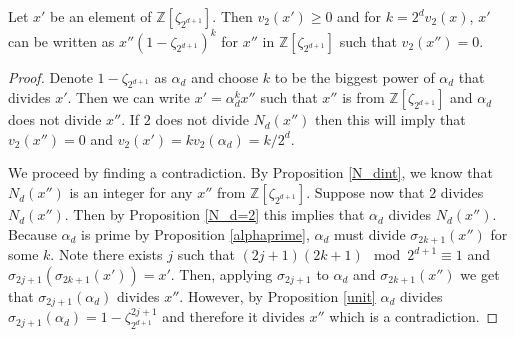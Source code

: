 \documentclass[12pt]{dalthesis}
\begin{document}
\begin{proposition}
\label{propA.22}
Let $x'$ be an element of $\mathbb{Z}[\zeta_{2^{d+1}}]$. Then $v_2(x') \geq 0$ and for $k=2^d v_2(x)$, $x'$ can be written as $x''(1-\zeta_{2^{d+1}})^k$ for $x''$ in $\mathbb{Z}[\zeta_{2^{d+1}}]$ such that $v_2(x'') = 0$.
\end{proposition}
\begin{proof}
Denote $1-\zeta_{2^{d+1}}$ as $\alpha_d$ and choose $k$ to be the biggest power of $\alpha_d$ that divides $x'$. Then we can write $x' = \alpha_d^k x''$ such that $x''$ is from $\mathbb{Z}[\zeta_{2^{d+1}}]$ and $\alpha_d$ does not divide $x''$. If $2$ does not divide $N_d(x'')$ then this will imply that $v_2(x'') = 0$ and $v_2(x') = kv_2(\alpha_d) = k/2^d$.

We proceed by finding a contradiction. By Proposition \ref{N_dint}, we know that $N_d(x'')$ is an integer for any $x''$ from $\mathbb{Z}[\zeta_{2^{d+1}}]$. Suppose now that $2$ divides $N_d(x'')$. Then by Proposition \ref{N_d=2} this implies that $\alpha_d$ divides $N_d(x'')$. Because $\alpha_d$ is prime by Proposition \ref{alphaprime}, $\alpha_d$ must divide $\sigma_{2k+1}(x'')$ for some $k$. Note there exists $j$ such that $(2j+1)(2k+1) \mod 2^{d+1} \equiv 1$ and $\sigma_{2j+1}(\sigma_{2k+1}(x')) = x'$. Then, applying $\sigma_{2j+1}$ to $\alpha_d$ and $\sigma_{2k+1}(x'')$ we get that $\sigma_{2j+1}(\alpha_d)$ divides $x''$. However, by Proposition \ref{unit} $\alpha_d$ divides $\sigma_{2j+1}(\alpha_d) = 1 - \zeta_{2^{d+1}}^{2j+1}$ and therefore it divides $x''$ which is a contradiction.
\end{proof}
\end{document}
